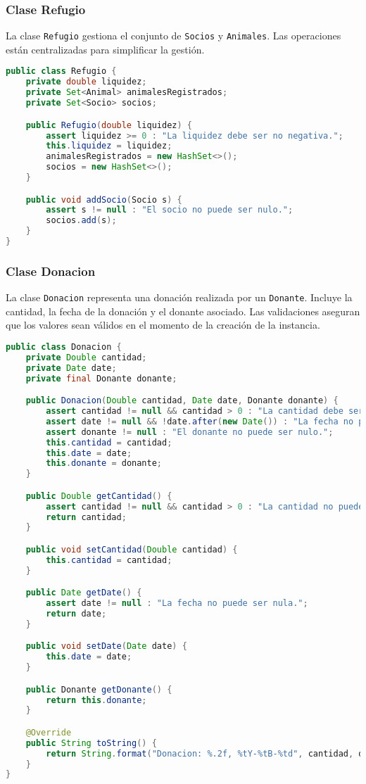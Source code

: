 \subsubsection{Clase Refugio}
La clase \texttt{Refugio} gestiona el conjunto de \texttt{Socios} y \texttt{Animales}. 
Las operaciones están centralizadas para simplificar la gestión.
\label{codigo:refugio}
\begin{lstlisting}[style = javaNormal, language=Java] 
public class Refugio {
    private double liquidez;
    private Set<Animal> animalesRegistrados;
    private Set<Socio> socios;

    public Refugio(double liquidez) {
        assert liquidez >= 0 : "La liquidez debe ser no negativa.";
        this.liquidez = liquidez;
        animalesRegistrados = new HashSet<>();
        socios = new HashSet<>();
    }

    public void addSocio(Socio s) {
        assert s != null : "El socio no puede ser nulo.";
        socios.add(s);
    }
}
\end{lstlisting}

\subsubsection{Clase Donacion}
La clase \texttt{Donacion} representa una donación realizada por un \texttt{Donante}. 
Incluye la cantidad, la fecha de la donación y el donante asociado. Las validaciones 
aseguran que los valores sean válidos en el momento de la creación de la instancia.
\label{codigo:donacion}
\begin{lstlisting}[style = javaNormal, language=Java] 
public class Donacion {
    private Double cantidad;
    private Date date;
    private final Donante donante;

    public Donacion(Double cantidad, Date date, Donante donante) {
        assert cantidad != null && cantidad > 0 : "La cantidad debe ser positiva.";
        assert date != null && !date.after(new Date()) : "La fecha no puede ser nula ni estar en el futuro.";
        assert donante != null : "El donante no puede ser nulo.";
        this.cantidad = cantidad;
        this.date = date;
        this.donante = donante;
    }

    public Double getCantidad() {
        assert cantidad != null && cantidad > 0 : "La cantidad no puede ser nula.";
        return cantidad;
    }

    public void setCantidad(Double cantidad) {
        this.cantidad = cantidad;
    }

    public Date getDate() {
        assert date != null : "La fecha no puede ser nula.";
        return date;
    }

    public void setDate(Date date) {
        this.date = date;
    }

    public Donante getDonante() {
        return this.donante;
    }

    @Override
    public String toString() {
        return String.format("Donacion: %.2f, %tY-%tB-%td", cantidad, date, date, date);
    }
}
\end{lstlisting}
\label{codigo:adopcion}
